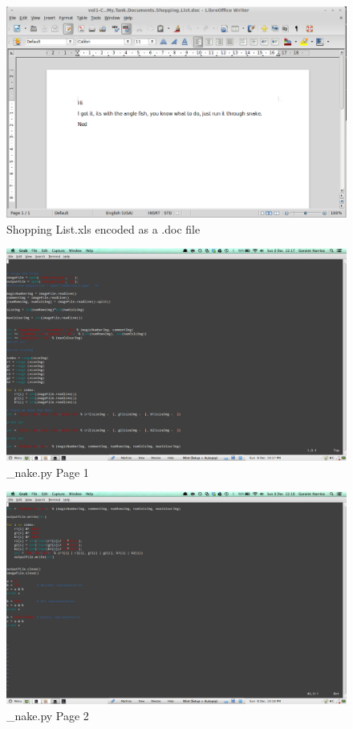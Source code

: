 \documentclass[12pt]{article}
\begin{document}
				\begin{figure}[ht!]
					\centering
					\includegraphics[width=12cm]{Images/ShoppingListWord.png}
					\caption{Shopping List.xls encoded as a .doc file}
				\end{figure}

				\begin{figure}[ht!]
					\centering
					\includegraphics[width=12cm]{Images/_nape1.png}
					\caption{\_nake.py Page 1}
				\end{figure}

				\begin{figure}[ht!]
					\centering
					\includegraphics[width=12cm]{Images/_nape2.png}
					\caption{\_nake.py Page 2}
				\end{figure}
				
\end{document}
